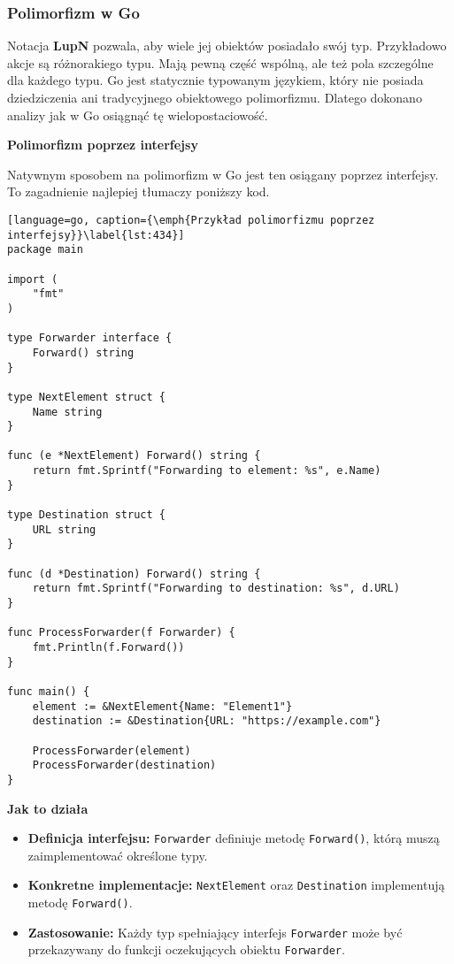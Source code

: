 \subsubsection{Polimorfizm w Go}

Notacja \textbf{LupN} pozwala, aby wiele jej obiektów posiadało swój typ. Przykładowo akcje są różnorakiego typu. Mają pewną część wspólną, ale też pola szczególne dla każdego typu. Go jest statycznie typowanym językiem, który nie posiada dziedziczenia ani tradycyjnego obiektowego polimorfizmu. Dlatego dokonano analizy jak w Go osiągnąć tę wielopostaciowość.

\textbf{Polimorfizm poprzez interfejsy}

Natywnym sposobem na polimorfizm w Go jest ten osiągany poprzez interfejsy. To zagadnienie najlepiej tłumaczy poniższy kod.


\begin{lstlisting}[language=go, caption={\emph{Przykład polimorfizmu poprzez interfejsy}}\label{lst:434}]
package main

import (
	"fmt"
)

type Forwarder interface {
	Forward() string
}

type NextElement struct {
	Name string
}

func (e *NextElement) Forward() string {
	return fmt.Sprintf("Forwarding to element: %s", e.Name)
}

type Destination struct {
	URL string
}

func (d *Destination) Forward() string {
	return fmt.Sprintf("Forwarding to destination: %s", d.URL)
}

func ProcessForwarder(f Forwarder) {
	fmt.Println(f.Forward())
}

func main() {
	element := &NextElement{Name: "Element1"}
	destination := &Destination{URL: "https://example.com"}

	ProcessForwarder(element)
	ProcessForwarder(destination)
}
\end{lstlisting}

\textbf{Jak to działa}

\begin{itemize}
    \item \textbf{Definicja interfejsu:}  
    \texttt{Forwarder} definiuje metodę \texttt{Forward()}, którą muszą zaimplementować określone typy.
    
    \item \textbf{Konkretne implementacje:}  
    \texttt{NextElement} oraz \texttt{Destination} implementują metodę \texttt{Forward()}.
    
    \item \textbf{Zastosowanie:}  
    Każdy typ spełniający interfejs \texttt{Forwarder} może być przekazywany do funkcji oczekujących obiektu \texttt{Forwarder}.
\end{itemize}

